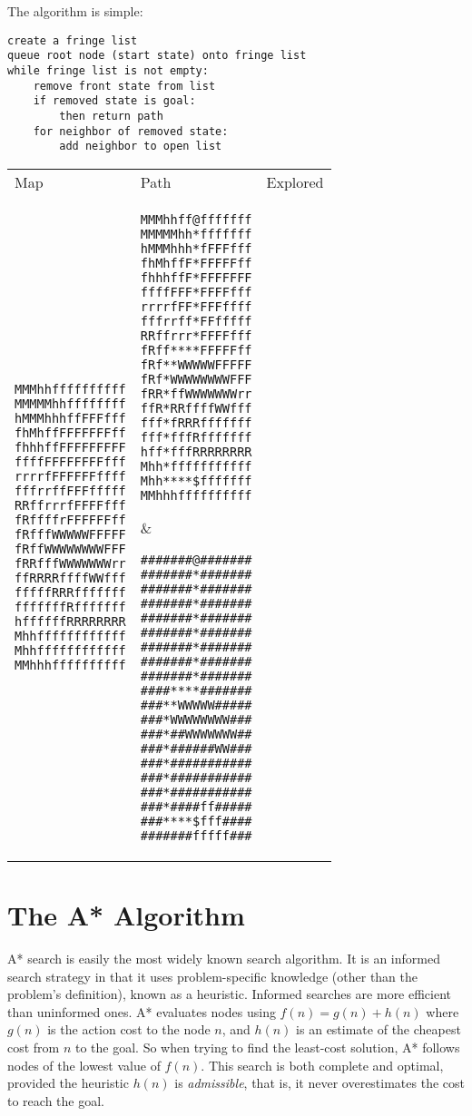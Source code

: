 \documentclass[12pt, article]{scrartcl}
\begin{document}
The algorithm is simple: 

\begin{verbatim}
create a fringe list
queue root node (start state) onto fringe list
while fringe list is not empty:
    remove front state from list
    if removed state is goal:
        then return path
    for neighbor of removed state:
        add neighbor to open list
\end{verbatim}

\begin{tabular}{p{2in} p{2in} p{2in}}
Map & Path & Explored \\
\begin{verbatim}
MMMhhffffffffff
MMMMMhhffffffff
hMMMhhhffFFFfff
fhMhffFFFFFFFff
fhhhffFFFFFFFFF
ffffFFFFFFFFfff
rrrrfFFFFFFffff
fffrrffFFFfffff
RRffrrrfFFFFfff
fRffffrFFFFFFff
fRfffWWWWWFFFFF
fRffWWWWWWWWFFF
fRRfffWWWWWWWrr
ffRRRRffffWWfff
fffffRRRfffffff
fffffffRfffffff
hffffffRRRRRRRR
Mhhffffffffffff
Mhhffffffffffff
MMhhhffffffffff
\end{verbatim}
&
\begin{verbatim}
MMMhhff@fffffff
MMMMMhh*fffffff
hMMMhhh*fFFFfff
fhMhffF*FFFFFff
fhhhffF*FFFFFFF
ffffFFF*FFFFfff
rrrrfFF*FFFffff
fffrrff*FFfffff
RRffrrr*FFFFfff
fRff****FFFFFff
fRf**WWWWWFFFFF
fRf*WWWWWWWWFFF
fRR*ffWWWWWWWrr
ffR*RRffffWWfff
fff*fRRRfffffff
fff*fffRfffffff
hff*fffRRRRRRRR
Mhh*fffffffffff
Mhh****$fffffff
MMhhhffffffffff
\end{verbatim}
&
\begin{verbatim}
#######@#######
#######*#######
#######*#######
#######*#######
#######*#######
#######*#######
#######*#######
#######*#######
#######*#######
####****#######
###**WWWWW#####
###*WWWWWWWW###
###*##WWWWWWW##
###*######WW###
###*###########
###*###########
###*###########
###*####ff#####
###****$fff####
#######fffff###
\end{verbatim}
\end{tabular}

\section{The A* Algorithm}
A* search is easily the most widely known search algorithm. It is an informed search strategy in that it uses problem-specific knowledge (other than the problem's definition), known as a heuristic. Informed searches are more efficient than uninformed ones. A* evaluates nodes using $f(n) = g(n) + h(n)$ where $g(n)$ is the action cost to the node $n$, and $h(n)$ is an estimate of the cheapest cost from $n$ to the goal. So when trying to find the least-cost solution, A* follows nodes of the lowest value of $f(n)$. This search is both complete and optimal, provided the heuristic $h(n)$ is \emph{admissible}, that is, it never overestimates the cost to reach the goal. \\
\end{document}
